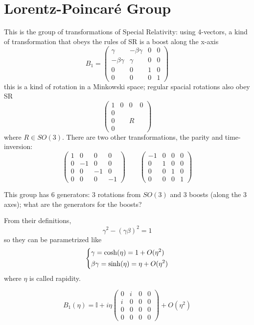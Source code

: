 \section{Lorentz-Poincaré Group}
This is the group of transformations of Special Relativity: using 4-vectors, a kind of
transformation that obeys the rules of SR is a boost along the x-axis
$$B_1=\begin{pmatrix}
\gamma&-\beta\gamma&0&0\\
-\beta\gamma&\gamma&0&0\\
0&0&1&0\\
0&0&0&1
\end{pmatrix}
$$
this is a kind of rotation in a Minkowski space; regular spacial rotations also obey
SR
$$\begin{pmatrix}
1&0&0&0\\
0&&&\\
0&&R&\\
0&&&
\end{pmatrix}
$$
where $R\in SO(3)$.
There are two other transformations, the parity and time-inversion:
$$\begin{pmatrix}
1&0&0&0\\
0&-1&0&0\\
0&0&-1&0\\
0&0&0&-1
\end{pmatrix}\qquad
\begin{pmatrix}
-1&0&0&0\\
0&1&0&0\\
0&0&1&0\\
0&0&0&1
\end{pmatrix}
$$

This group has 6 generators: 3 rotations from $SO(3)$ and 3 boosts (along the 3 axes);
what are the generators for the boosts?

From their definitions,
$$\gamma^2 - (\gamma\beta)^2 = 1$$
so they can be parametrized like
$$\begin{dcases*}
\gamma = \cosh(\eta) = 1 +O(\eta^2)\\
\beta\gamma = \sinh(\eta) = \eta + O(\eta^2)
\end{dcases*}
$$
where $\eta$ is called rapidity.

$$B_1(\eta) = \mathbb{I} + i\eta\begin{pmatrix}
0&i&0&0\\
i&0&0&0\\
0&0&0&0\\
0&0&0&0
\end{pmatrix} + O(\eta^2)
$$

